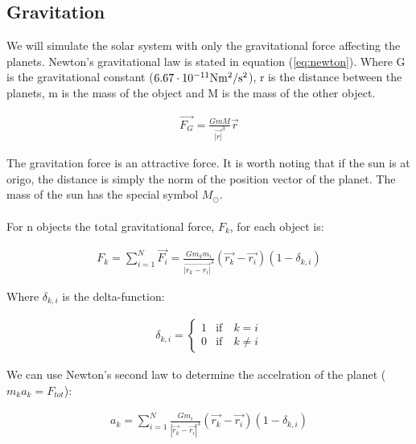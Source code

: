 %









\subsection{Gravitation}

We will simulate the solar system with only the gravitational force affecting the planets.  Newton's gravitational law is stated in equation (\ref{eq:newton})\cite{uniphys}. Where G is the gravitational constant ($6.67 \cdot 10^{-11} \rm{Nm^2/s^2}$), r is the distance between the planets, m is the mass of the object and M is the mass of the other object.

\begin{align}
	\vec{F_G}  =\frac{GmM}{\vec{|r|}^3}\vec{r}
	\label{eq:newton}
\end{align}

The gravitation force is an attractive force. It is worth noting that if the sun is at origo, the distance is simply the norm of the position vector of the planet. The mass of the sun has the special symbol $M_{\odot}$. 
\\
\\
For n objects the total gravitational force, $F_k$, for each object is: 


\begin{align}
	F_k = 
	\sum_{i = 1}^{N}
	\vec{F_i}  
	=
	\frac{Gm_km_i}
	{\vec{|r_k - r_i|}^3}
	(\vec{r_k} - \vec{r_i})
	(1 - \delta_{k,i})
	\label{eq:newton_all}
\end{align}

Where $\delta_{k,i}$ is the delta-function:

\begin{align*}
	\delta_{k,i} = \left\{\begin{matrix}
					1 & \text{if} \quad k =  i\\
					0 & \text{if} \quad k \neq i 
					\end{matrix}\right.
\end{align*}



We can use Newton's second law to determine the accelration of the planet ($m_ka_k= F_{tot}$):

\begin{align}
	a_k
	=
	\sum_{i = 1}^{N}
	\frac{Gm_i}
	{|\vec{r_k} - \vec{r_i}|^3}
	(\vec{r_k} - \vec{r_i})
	(1 - \delta_{k,i})
	\label{eq:acceleration_all}
\end{align}














